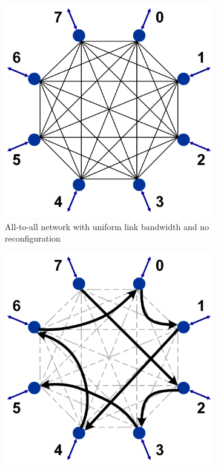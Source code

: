 \begin{figure}[t!]
    \centering
        \begin{subfigure}[t]{0.31\linewidth}
        \includegraphics[width=\textwidth, clip]{Figures/logtopawgr.jpg}
        \caption{All-to-all network with uniform link bandwidth and no reconfiguration}
        		\label{fig:logtopawgr}
       \end{subfigure}
        \hspace{0.1cm}
        \begin{subfigure}[t]{0.31\linewidth}
        \includegraphics[width=\textwidth, clip]{Figures/logtopmems.jpg}

\end{subfigure}
\end{figure}
